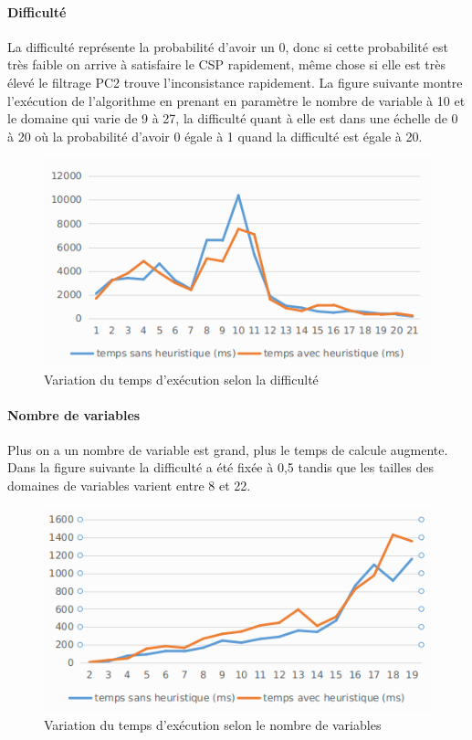 \documentclass[12pt]{report}
\begin{document}
\paragraph{Difficulté}
La difficulté représente la probabilité d’avoir un 0, donc si cette probabilité est très faible on arrive à satisfaire le CSP rapidement, même chose si elle est très élevé le filtrage PC2 trouve l’inconsistance rapidement. La figure suivante montre l'exécution de l'algorithme en prenant en paramètre le nombre de variable à 10 et le domaine qui varie de 9 à 27, la difficulté quant à elle est dans une échelle de 0 à 20 où la probabilité d’avoir 0 égale à 1 quand la difficulté est égale à 20.
\begin{figure}[H]
	\centering
	\includegraphics[scale=0.5]{imgs/random2.png}
	\caption{Variation du temps d'exécution selon la difficulté}
	\label{fig:diff}
\end{figure}
\paragraph{Nombre de variables}
Plus on a un nombre de variable est grand, plus le temps de calcule augmente. Dans la figure suivante la difficulté a été fixée à 0,5 tandis que les tailles des domaines de variables varient entre 8 et 22.
\begin{figure}[H]
	\centering
	\includegraphics[scale=0.5]{imgs/variables.png}
	\caption{Variation du temps d'exécution selon le nombre de variables}
	\label{fig:vars}
\end{figure}
\end{document}
